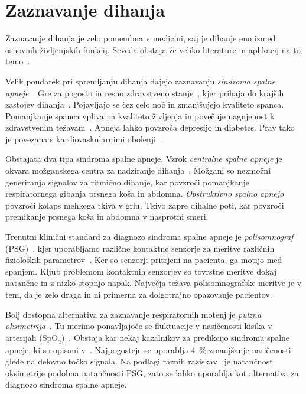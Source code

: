\section{Zaznavanje dihanja}\label{sec:detekcija-dihanja}
Zaznavanje dihanja je zelo pomembna v medicini, saj je dihanje eno izmed osnovnih življenjskih funkcij. Seveda obstaja že veliko literature in aplikacij na to temo~\cite{sathyanarayana2015vision}.

Velik poudarek pri spremljanju dihanja dajejo zaznavanju  \emph{sindroma spalne apneje}~\cite{sathyanarayana2015vision}. Gre za pogosto in resno zdravstveno stanje~\cite{wang2006vision}, kjer prihaja do krajših zastojev dihanja~\cite{flemons2002obstructive}. Pojavljajo se čez celo noč in zmanjšujejo kvaliteto spanca. Pomanjkanje spanca vpliva na kvaliteto življenja in povečuje nagnjenost k zdravstvenim težavam~\cite{malhotra2002obstructive}. Apneja lahko povzroča depresijo in diabetes. Prav tako je povezana s kardiovaskularnimi obolenji~\cite{takemura2005respiratory}.

Obstajata dva tipa sindroma spalne apneje. Vzrok \emph{centralne spalne apneje} je okvara možganskega centra za nadziranje dihanja~\cite{javaheri2010central}. Možgani so nezmožni generiranja signalov za ritmično dihanje, kar povzroči pomanjkanje respiratornega gibanja prsnega koša in abdomna. \emph{Obstruktivno spalno apnejo} povzroči kolaps mehkega tkiva v grlu. Tkivo zapre dihalne poti, kar povzroči premikanje prsnega koša in abdomna v nasprotni smeri.

Trenutni klinični standard za diagnozo sindroma spalne apneje je \emph{polisomnograf} (PSG)~\cite{collop2007clinical}, kjer uporabljamo različne kontaktne senzorje za meritve različnih fizioloških parametrov~\cite{heinrich2015video}. Ker so senzorji pritrjeni na pacienta, ga motijo med spanjem. Kljub problemom kontaktnih senzorjev so tovrstne meritve dokaj natančne in z nizko stopnjo napak. Največja težava polisomnografske meritve je v tem, da je zelo draga in ni primerna za dolgotrajno opazovanje pacientov.

Bolj dostopna alternativa za zaznavanje respiratornih motenj je \emph{pulzna oksimetrija}~\cite{netzer2001overnight}. Tu merimo ponavljajoče se fluktuacije v nasičenosti kisika v arterijah ($\mathrm{SpO}_{2}$)~\cite{levy1996accuracy}. Obstaja kar nekaj kazalnikov za predikcijo sindroma spalne apneje, ki so opisani v~\cite{netzer2001overnight, magalang2003prediction}. Najpogosteje se uporablja \SI{4}{\%} zmanjšanje nasičenosti glede na delovno točko signala. Na podlagi raznih raziskav~\cite{cooper1991value,magalang2003prediction,netzer2001overnight,levy1996accuracy} je natančnost oksimetrije podobna natančnosti PSG, zato se lahko uporablja kot alternativa za diagnozo sindroma spalne apneje.

